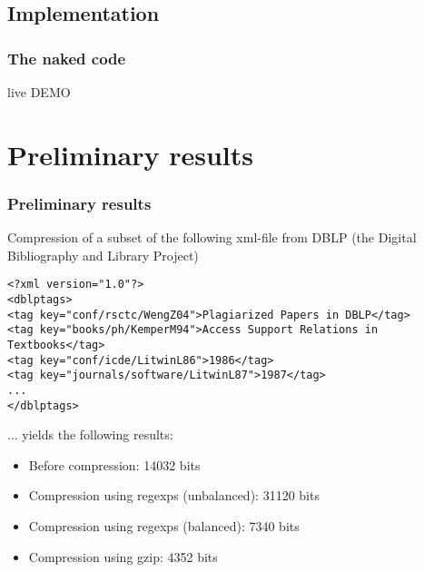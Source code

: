 \documentclass[slidestop,compress,mathserif, xcolor=table]{beamer}
\begin{document}
\subsection{Implementation}

\begin{frame}[c]
  \frametitle{The naked code}

  \begin{center}
    \Huge{live DEMO}
  \end{center}
  
\end{frame}

\section{Preliminary results}

\begin{frame}[fragile]
  \frametitle{Preliminary results}

  Compression of a subset of the following xml-file from DBLP (the Digital
  Bibliography and Library Project)

{\tiny
\begin{verbatim}
<?xml version="1.0"?>
<dblptags>
<tag key="conf/rsctc/WengZ04">Plagiarized Papers in DBLP</tag>
<tag key="books/ph/KemperM94">Access Support Relations in Textbooks</tag>
<tag key="conf/icde/LitwinL86">1986</tag>
<tag key="journals/software/LitwinL87">1987</tag>
...
</dblptags>
\end{verbatim}
} 

  ... yields the following results:

  \begin{itemize}
  \item Before compression: 14032 bits
  \item Compression using regexps (unbalanced): 31120 bits
  \item Compression using regexps (balanced): 7340 bits
  \item Compression using gzip: 4352 bits
  \end{itemize}

\end{frame}
\end{document}
